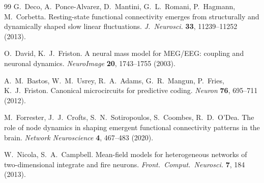 \documentclass[11pt,a4paper]{article}
\begin{document}
\begin{thebibliography}{99}
G.~Deco, A.~Ponce-Alvarez, D.~Mantini, G.~L.~Romani, P.~Hagmann, M.~Corbetta.
Resting-state functional connectivity emerges from structurally and dynamically shaped slow linear fluctuations.
\emph{J.\ Neurosci.} \textbf{33}, 11239--11252 (2013).

O.~David, K.~J.~Friston.
A neural mass model for MEG/EEG: coupling and neuronal dynamics.
\emph{NeuroImage} \textbf{20}, 1743--1755 (2003).

A.~M.~Bastos, W.~M.~Usrey, R.~A.~Adams, G.~R.~Mangun, P.~Fries, K.~J.~Friston.
Canonical microcircuits for predictive coding.
\emph{Neuron} \textbf{76}, 695--711 (2012).

M.~Forrester, J.~J.~Crofts, S.~N.~Sotiropoulos, S.~Coombes, R.~D.~O'Dea.
The role of node dynamics in shaping emergent functional connectivity patterns in the brain.
\emph{Network Neuroscience} \textbf{4}, 467--483 (2020).

W.~Nicola, S.~A.~Campbell.
Mean-field models for heterogeneous networks of two-dimensional integrate and fire neurons.
\emph{Front.\ Comput.\ Neurosci.} \textbf{7}, 184 (2013).

\end{thebibliography}
\fi
\end{document}
